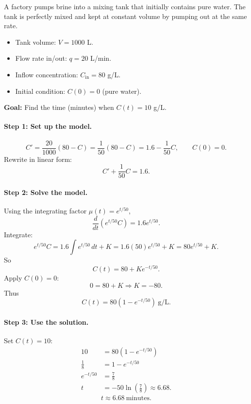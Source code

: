 \documentclass[10pt,letterpaper]{article}
\begin{document}
\begin{example}[2]{

A factory pumps brine into a mixing tank that initially contains pure water. The tank is perfectly mixed and kept at constant volume by pumping out at the same rate.

\begin{itemize}
    \item Tank volume: $V=1000$ L.
    \item Flow rate in/out: $q=20$ L/min.
    \item Inflow concentration: $C_{\text{in}}=80$ g/L.
    \item Initial condition: $C(0)=0$ (pure water).
\end{itemize}
\textbf{Goal:} Find the time (minutes) when $C(t)=10$ g/L.
}


\paragraph{Step 1: Set up the model.}
\[
C'=\frac{20}{1000}(80-C)=\frac{1}{50}(80-C)
=1.6-\frac{1}{50}C,
\qquad
C(0)=0.
\]
Rewrite in linear form:
\[
C' + \frac{1}{50}C = 1.6.
\]

\paragraph{Step 2: Solve the model.}
Using the integrating factor $\mu(t)=e^{t/50}$,
\[
\frac{d}{dt}\left(e^{t/50}C\right)=1.6e^{t/50}.
\]
Integrate:
\[
e^{t/50}C = 1.6\int e^{t/50}\,dt + K
=1.6(50)e^{t/50}+K
=80e^{t/50}+K.
\]
So
\[
C(t)=80+Ke^{-t/50}.
\]
Apply $C(0)=0$:
\[
0=80+K \Rightarrow K=-80.
\]
Thus
\[
\boxed{
C(t)=80\left(1-e^{-t/50}\right)\ \text{g/L}.
}
\]

\paragraph{Step 3: Use the solution.}
Set $C(t)=10$:
\begin{align*}
10 &= 80\left(1-e^{-t/50}\right)\\
\frac{1}{8} &= 1-e^{-t/50}\\
e^{-t/50} &= \frac{7}{8}\\
t &= -50\ln\left(\frac{7}{8}\right)\approx 6.68.
\end{align*}
\[
\boxed{t \approx 6.68\ \text{minutes}.}
\]
\end{example}

\end{document}
